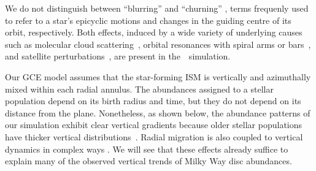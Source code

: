 \documentclass[draft2.tex]{subfiles}
\begin{document}
We do not distinguish between ``blurring'' and ``churning'' 
\citep{Schoenrich2009a}, terms frequenly used to refer to a star's epicyclic 
motions and changes in the guiding centre of its orbit, respectively. 
Both effects, induced by a wide variety of underlying causes such as molecular 
cloud scattering~\citep{Mihalas1981, Jenkins1990, Jenkins1992}, orbital 
resonances with spiral arms or bars~\citep{Sellwood2002, Minchev2011}, and 
satellite perturbations~\citep{Bird2012}, are present in the~\hsim~simulation. 
\par 
Our GCE model assumes that the star-forming ISM is vertically and azimuthally 
mixed within each radial annulus. 
The abundances assigned to a stellar population depend on its birth radius and 
time, but they do not depend on its distance from the plane. 
Nonetheless, as shown below, the abundance patterns of our simulation exhibit 
clear vertical gradients because older stellar populations have thicker 
vertical distributions~\citep{Bird2020}. 
Radial migration is also coupled to vertical dynamics in complex ways 
\citep{Solway2012, Minchev2012b}. 
We will see that these effects already suffice to explain many of the observed 
vertical trends of Milky Way disc abundances. 


\end{document}

